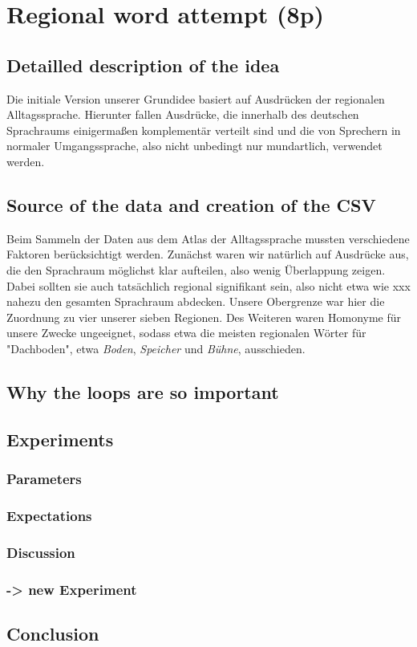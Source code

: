 \documentclass[../Main.tex]{subfiles}
\begin{document}
\section{Regional word attempt (8p)}
\subsection{Detailled description of the idea}
Die initiale Version unserer Grundidee basiert auf Ausdrücken der regionalen Alltagssprache. Hierunter fallen Ausdrücke, die innerhalb des deutschen Sprachraums einigermaßen komplementär verteilt sind und die von Sprechern in normaler Umgangssprache, also nicht unbedingt nur mundartlich, verwendet werden.

\subsection{Source of the data and creation of the CSV}
Beim Sammeln der Daten aus dem Atlas der Alltagssprache mussten verschiedene Faktoren berücksichtigt werden. Zunächst waren wir natürlich auf Ausdrücke aus, die den Sprachraum möglichst klar aufteilen, also wenig Überlappung zeigen. Dabei sollten sie auch tatsächlich regional signifikant sein, also nicht etwa wie xxx nahezu den gesamten Sprachraum abdecken. Unsere Obergrenze war hier die Zuordnung zu vier unserer sieben Regionen. Des Weiteren waren Homonyme für unsere Zwecke ungeeignet, sodass etwa die meisten regionalen Wörter für "Dachboden", etwa \textit{Boden}, \textit{Speicher} und \textit{Bühne}, ausschieden.

\subsection{Why the loops are so important}
\subsection{Experiments}
\subsubsection{Parameters}
\subsubsection{Expectations}
\subsubsection{Discussion}
\subsubsection{-> new Experiment}
\subsection{Conclusion}
\end{document}
